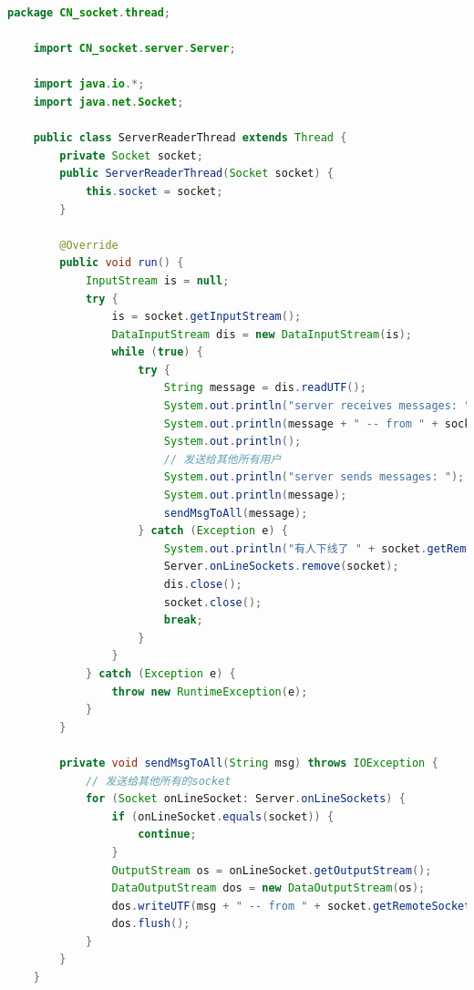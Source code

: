 \documentclass{article}
\begin{document}
	\begin{lstlisting}[language=Java, title=ServerReaderThread.java, tabsize=4]
	package CN_socket.thread;
	
	import CN_socket.server.Server;
	
	import java.io.*;
	import java.net.Socket;
	
	public class ServerReaderThread extends Thread {
		private Socket socket;
		public ServerReaderThread(Socket socket) {
			this.socket = socket;
		}
		
		@Override
		public void run() {
			InputStream is = null;
			try {
				is = socket.getInputStream();
				DataInputStream dis = new DataInputStream(is);
				while (true) {
					try {
						String message = dis.readUTF();
						System.out.println("server receives messages: ");
						System.out.println(message + " -- from " + socket.getRemoteSocketAddress());
						System.out.println();
						// 发送给其他所有用户
						System.out.println("server sends messages: ");
						System.out.println(message);
						sendMsgToAll(message);
					} catch (Exception e) {
						System.out.println("有人下线了 " + socket.getRemoteSocketAddress());
						Server.onLineSockets.remove(socket);
						dis.close();
						socket.close();
						break;
					}
				}
			} catch (Exception e) {
				throw new RuntimeException(e);
			}
		}
		
		private void sendMsgToAll(String msg) throws IOException {
			// 发送给其他所有的socket
			for (Socket onLineSocket: Server.onLineSockets) {
				if (onLineSocket.equals(socket)) {
					continue;
				}
				OutputStream os = onLineSocket.getOutputStream();
				DataOutputStream dos = new DataOutputStream(os);
				dos.writeUTF(msg + " -- from " + socket.getRemoteSocketAddress());
				dos.flush();
			}
		}
	}
	
	\end{lstlisting}
\end{document}
